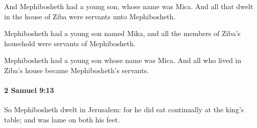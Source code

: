 			\begin{versebox}
					\item[BHS] 
					\item[ASV] And Mephibosheth had a young son, whose name was Mica. And all that dwelt in the house of Ziba were servants unto Mephibosheth.
					\item[NIV] Mephibosheth had a young son named Mika, and all the members of Ziba’s household were servants of Mephibosheth.
					\item[NRSV] Mephibosheth had a young son whose name was Mica. And all who lived in Ziba’s house became Mephibosheth’s servants.
			\end{versebox}

		\paragraph{2 Samuel 9:13} %
			\label{2SAMUEL-9-13}

			So Mephibosheth dwelt in Jerusalem: for he did eat continually at the king’s table; and was lame on both his feet.


